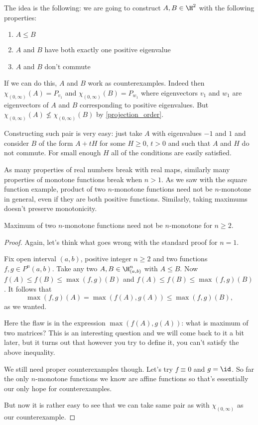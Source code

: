 The idea is the following: we are going to construct $A, B \in \H^{2}$ with the following properties:
\begin{enumerate}
	\item $A \leq B$
	\item $A$ and $B$ have both exactly one positive eigenvalue
	\item $A$ and $B$ don't commute
\end{enumerate}
If we can do this, $A$ and $B$ work as counterexamples. Indeed then $\chi_{(0, \infty)}(A) = P_{v_{1}}$ and $\chi_{(0, \infty)}(B) = P_{w_{1}}$ where eigenvectors $v_{1}$ and $w_{1}$ are eigenvectors of $A$ and $B$ corresponding to positive eigenvalues. But $\chi_{(0, \infty)}(A) \not\leq \chi_{(0, \infty)}(B)$ by \ref{projection_order}.

Constructing such pair is very easy: just take $A$ with eigenvalues $-1$ and $1$ and consider $B$ of the form $A + t H$ for some $H \geq 0$, $t > 0$ and such that $A$ and $H$ do not commute. For small enough $H$ all of the conditions are easily satisfied.

As many properties of real numbers break with real maps, similarly many properties of monotone functions break when $n > 1$. As we saw with the square function example, product of two $n$-monotone functions need not be $n$-monotone in general, even if they are both positive functions. Similarly, taking maximums doesn't preserve monotonicity.

\begin{prop}
	Maximum of two $n$-monotone functions need not be $n$-monotone for $n \geq 2$.
\end{prop}
\begin{proof}
	Again, let's think what goes wrong with the standard proof for $n = 1$.

	Fix open interval $(a, b)$, positive integer $n \geq 2$ and two functions $f, g \in P^{n}(a, b)$. Take any two $A, B \in \H_{(a, b)}^{n}$ with $A \leq B$. Now $f(A) \leq f(B) \leq \max(f, g)(B)$ and $f(A) \leq f(B) \leq \max(f, g)(B)$. It follows that
	\[
		\max(f, g)(A) = \max(f(A), g(A)) \leq \max(f, g)(B),
	\]
	as we wanted.

	Here the flaw is in the expression $\max(f(A), g(A))$: what is maximum of two matrices? This is an interesting question and we will come back to it a bit later, but it turns out that however you try to define it, you can't satisfy the above inequality.

	We still need proper counterexamples though. Let's try $f \equiv 0$ and $g = \id$. So far the only $n$-monotone functions we know are affine functions so that's essentially our only hope for counterexamples.

	But now it is rather easy to see that we can take same pair as with $\chi_{(0, \infty)}$ as our counterexample.
\end{proof}

